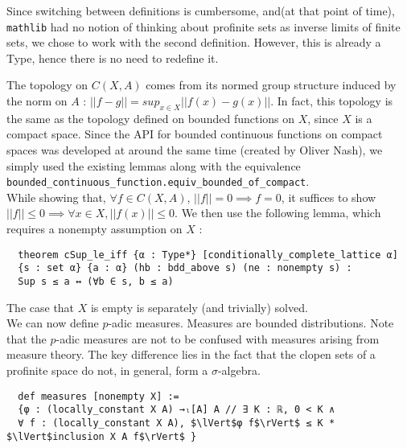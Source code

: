 \documentclass[11pt]{article}
\newcommand{\lean}[1]{\texttt{#1}\xspace} %
\begin{document}
Since switching between definitions is cumbersome, and(at that point of time), \texttt{mathlib}
had no notion of thinking about profinite sets as inverse limits of finite sets, we chose to work
with the second definition. However, this is already a Type, hence there is no need to redefine it.

The topology on $C(X, A)$ comes from its normed group structure induced by the norm on $A$ :
$|| f - g || = sup_{x \in X} || f(x) - g(x) ||$. In fact, this topology is the same as the 
topology defined on bounded functions on $X$, since $X$ is a compact space. Since the API for bounded 
continuous functions on compact spaces was developed at around the same time (created by Oliver Nash), 
we simply used the existing lemmas along with the equivalence 
\lean{bounded\_continuous\_function.equiv\_bounded\_of\_compact}. \\

While showing that, $\forall f \in C(X, A)$, $||f|| = 0 \implies f = 0$, it suffices to show 
$||f|| \le 0 \implies \forall x \in X, ||f(x)|| \le 0$. We then use the following lemma, which 
requires a nonempty assumption on $X$ :
\begin{lstlisting}
  theorem cSup_le_iff {α : Type*} [conditionally_complete_lattice α] 
  {s : set α} {a : α} (hb : bdd_above s) (ne : nonempty s) : 
  Sup s ≤ a ↔ (∀b ∈ s, b ≤ a)
\end{lstlisting}

The case that $X$ is empty is separately (and trivially) solved. \\

We can now define $p$-adic measures. Measures are bounded distributions. Note that the $p$-adic measures
are not to be confused with measures arising from measure theory. The key difference lies in the
fact that the clopen sets of a profinite space do not, in general, form a $\sigma$-algebra. \\

\begin{lstlisting}
  def measures [nonempty X] :=
  {φ : (locally_constant X A) →ₗ[A] A // ∃ K : ℝ, 0 < K ∧ 
  ∀ f : (locally_constant X A), $\lVert$φ f$\rVert$ ≤ K * $\lVert$inclusion X A f$\rVert$ }
\end{lstlisting}
\end{document}
